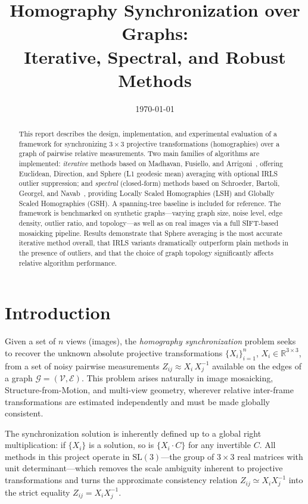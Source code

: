 \documentclass[11pt, a4paper]{article}
\title{Homography Synchronization over Graphs:\\
       Iterative, Spectral, and Robust Methods}
\author{}
\date{\today}
\begin{document}
\maketitle

\begin{abstract}
This report describes the design, implementation, and experimental evaluation of
a framework for synchronizing $3\times3$ projective transformations (homographies)
over a graph of pairwise relative measurements.  Two main families of algorithms
are implemented: \emph{iterative} methods based on Madhavan, Fusiello, and
Arrigoni~\cite{madhavan2024}, offering Euclidean, Direction, and Sphere (L1
geodesic mean) averaging with optional IRLS outlier suppression; and
\emph{spectral} (closed-form) methods based on Schroeder, Bartoli, Georgel, and
Navab~\cite{schroeder2011}, providing Locally Scaled Homographies (LSH) and
Globally Scaled Homographies (GSH).  A spanning-tree baseline is included for
reference.  The framework is benchmarked on synthetic graphs---varying graph
size, noise level, edge density, outlier ratio, and topology---as well as on
real images via a full SIFT-based mosaicking pipeline.  Results demonstrate that
Sphere averaging is the most accurate iterative method overall, that IRLS
variants dramatically outperform plain methods in the presence of outliers, and
that the choice of graph topology significantly affects relative algorithm
performance.
\end{abstract}

\section{Introduction}
\label{sec:introduction}

Given a set of $n$ views (images), the \emph{homography synchronization} problem
seeks to recover the unknown absolute projective transformations
$\{X_i\}_{i=1}^{n}$, $X_i \in \mathbb{R}^{3\times3}$, from a set of noisy
pairwise measurements $Z_{ij} \approx X_i \, X_j^{-1}$ available on the edges
of a graph $\mathcal{G} = (\mathcal{V}, \mathcal{E})$.  This problem arises
naturally in image mosaicking, Structure-from-Motion, and multi-view geometry,
wherever relative inter-frame transformations are estimated independently and
must be made globally consistent.

The synchronization solution is inherently defined up to a global right
multiplication: if $\{X_i\}$ is a solution, so is $\{X_i \cdot C\}$ for any
invertible $C$.  All methods in this project operate in $\mathrm{SL}(3)$---the
group of $3\times3$ real matrices with unit determinant---which removes the scale
ambiguity inherent to projective transformations and turns the approximate
consistency relation $Z_{ij} \simeq X_i X_j^{-1}$ into the strict equality
$Z_{ij} = X_i X_j^{-1}$.
\end{document}
